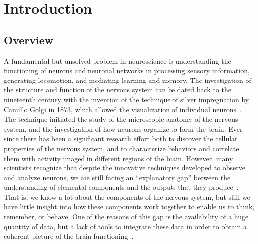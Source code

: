 \chapter*{Introduction} %



\fancyhead[RO,LE]{\thepage}

\setlength{\parskip}{0.5pt}

\bigskip

\section*{Overview}

A fundamental but unsolved problem in neuroscience is understanding the functioning of neurons and neuronal networks in processing sensory information, generating locomotion, and mediating learning and memory.
The investigation of the structure and function of the nervous system can be dated back to the nineteenth century with the invention of the technique of silver impregnation by Camillo Golgi in 1873, which allowed the visualization of individual neurons~\citep{drouin2015}. The technique initiated the study of the microscopic anatomy of the nervous system, and the investigation of how neurons organize to form the brain. 
Ever since there has been a significant research effort both to discover the cellular properties of the nervous system, and to characterize behaviors and correlate them with activity imaged in different regions of the brain.
However, many scientists recognize that despite the innovative techniques developed to observe and analyze neurons, we are still facing an ``explanatory gap'' between the understanding of elemental components and the outputs that they produce~\citep{parker2006,parker2010,dudai2004,paninski2018}. That is, we know a lot about the components of the nervous system, but still we have little insight into how these components work together to enable us to think, remember, or behave. One of the reasons of this gap is the availability of a huge quantity of data, but a lack of tools to integrate these data in order to obtain a coherent picture of the brain functioning~\citep{parker2010}.

